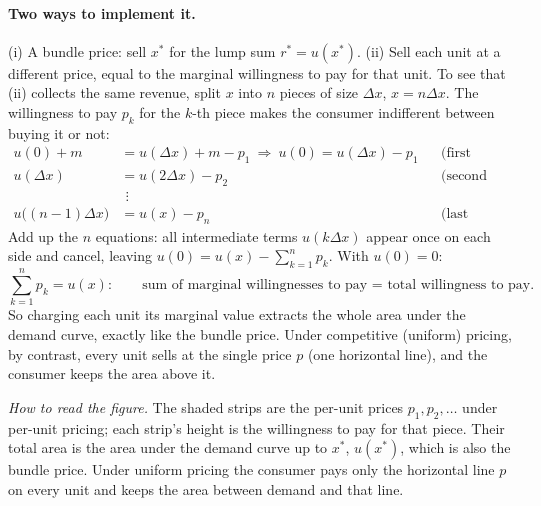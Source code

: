 \paragraph{Two ways to implement it.} (i) A bundle price: sell $x^*$ for the lump sum $r^*=u(x^*)$. (ii) Sell each unit at a different price, equal to the marginal willingness to pay for that unit. To see that (ii) collects the same revenue, split $x$ into $n$ pieces of size $\Delta x$, $x=n\Delta x$. The willingness to pay $p_k$ for the $k$-th piece makes the consumer indifferent between buying it or not:
\begin{align*}
u(0)+m&=u(\Delta x)+m-p_1\ \Longrightarrow\ u(0)=u(\Delta x)-p_1 &&\text{(first piece)}\\
u(\Delta x)&=u(2\Delta x)-p_2 &&\text{(second piece)}\\
&\ \,\vdots\\
u\big((n-1)\Delta x\big)&=u(x)-p_n &&\text{(last piece).}
\end{align*}
Add up the $n$ equations: all intermediate terms $u(k\Delta x)$ appear once on each side and cancel, leaving $u(0)=u(x)-\sum_{k=1}^n p_k$. With $u(0)=0$:
\[
\sum_{k=1}^{n}p_k=u(x):\qquad\text{sum of marginal willingnesses to pay = total willingness to pay.}
\]
So charging each unit its marginal value extracts the whole area under the demand curve, exactly like the bundle price. Under competitive (uniform) pricing, by contrast, every unit sells at the single price $p$ (one horizontal line), and the consumer keeps the area above it.

\begin{center}
\end{center}
\textit{How to read the figure.} The shaded strips are the per-unit prices $p_1,p_2,\dots$ under per-unit pricing; each strip's height is the willingness to pay for that piece. Their total area is the area under the demand curve up to $x^*$, $u(x^*)$, which is also the bundle price. Under uniform pricing the consumer pays only the horizontal line $p$ on every unit and keeps the area between demand and that line.

